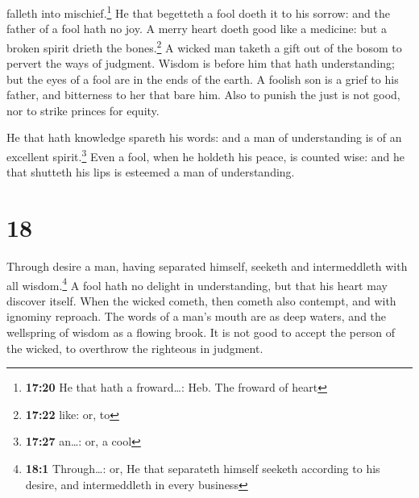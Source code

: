 falleth into mischief.\footnote{\textbf{17:20} He that hath a
  froward\ldots: Heb. The froward of heart}  He that
begetteth a fool doeth it to his sorrow: and the father of a fool hath
no joy.  A merry heart doeth good like a medicine: but a
broken spirit drieth the bones.\footnote{\textbf{17:22} like: or, to}
 A wicked man taketh a gift out of the bosom to pervert
the ways of judgment.  Wisdom is before him that hath
understanding; but the eyes of a fool are in the ends of the earth.
 A foolish son is a grief to his father, and bitterness
to her that bare him.  Also to punish the just is not
good, nor to strike princes for equity.

 He that hath knowledge spareth his words: and a man of
understanding is of an excellent spirit.\footnote{\textbf{17:27}
  an\ldots: or, a cool}  Even a fool, when he holdeth his
peace, is counted wise: and he that shutteth his lips is esteemed a man
of understanding.

\hypertarget{section-17}{%
\section{18}\label{section-17}}

 Through desire a man, having separated himself, seeketh
and intermeddleth with all wisdom.\footnote{\textbf{18:1} Through\ldots:
  or, He that separateth himself seeketh according to his desire, and
  intermeddleth in every business}  A fool hath no delight
in understanding, but that his heart may discover itself. 
When the wicked cometh, then cometh also contempt, and with ignominy
reproach.  The words of a man's mouth are as deep waters,
and the wellspring of wisdom as a flowing brook.  It is
not good to accept the person of the wicked, to overthrow the righteous
in judgment.

